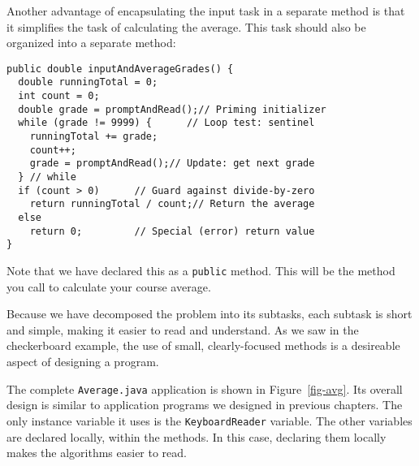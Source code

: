 
\noindent Another advantage of encapsulating the input task in a
separate method is that it simplifies the task of calculating the
average. This task should also be organized into a separate method:

\begin{jjjlisting}
\begin{lstlisting}
public double inputAndAverageGrades() {
  double runningTotal = 0;
  int count = 0;
  double grade = promptAndRead();// Priming initializer
  while (grade != 9999) {      // Loop test: sentinel
    runningTotal += grade;                           
    count++;                                          
    grade = promptAndRead();// Update: get next grade
  } // while
  if (count > 0)      // Guard against divide-by-zero
    return runningTotal / count;// Return the average
  else
    return 0;         // Special (error) return value
}
\end{lstlisting}
\end{jjjlisting}

\noindent Note that we have declared this as a {\tt public}
method. This will be the method you call to calculate your course
average. 

Because we have decomposed the problem into its subtasks, each subtask
is short and simple, making it easier to read and understand. As we saw
in the checkerboard example, the use of small, clearly-focused methods
is a desireable aspect of designing a program.

The complete {\tt Average.java} application is shown in
Figure~\ref{fig-avg}. Its overall design is similar to application
programs we designed in previous chapters. The only instance variable
it uses is the {\tt KeyboardReader} variable. The other variables are
declared locally, within the methods. In this case, declaring them
locally makes the algorithms easier to read.

